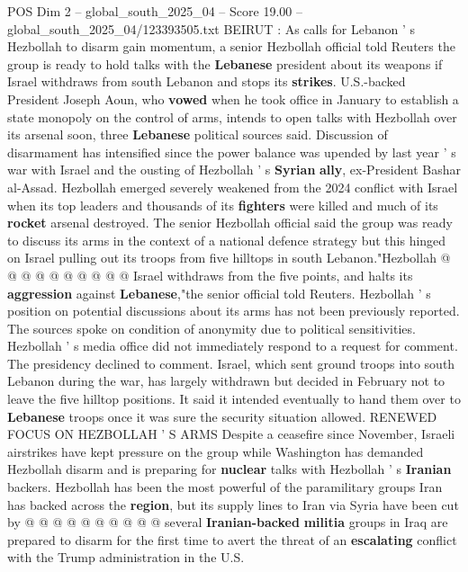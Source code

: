 \begin{textsample}{POS Dim 2 – global\_south\_2025\_04 – Score 19.00 – global\_south\_2025\_04/123393505.txt}  \label{ex:f2_pos_342}
BEIRUT : As calls for Lebanon ' s Hezbollah to disarm gain momentum, a senior Hezbollah official told Reuters the group is ready to hold talks with the \textbf{Lebanese} president about its weapons if Israel withdraws from south Lebanon and stops its \textbf{strikes}.
U.S.-backed President Joseph Aoun, who \textbf{vowed} when he took office in January to establish a state monopoly on the control of arms, intends to open talks with Hezbollah over its arsenal soon, three \textbf{Lebanese} political sources said.
Discussion of disarmament has intensified since the power balance was upended by last year ' s war with Israel and the ousting of Hezbollah ' s \textbf{Syrian} \textbf{ally}, ex-President Bashar al-Assad.
Hezbollah emerged severely weakened from the 2024 conflict with Israel when its top leaders and thousands of its \textbf{fighters} were killed and much of its \textbf{rocket} arsenal destroyed.
The senior Hezbollah official said the group was ready to discuss its arms in the context of a national defence strategy but this hinged on Israel pulling out its troops from five hilltops in south Lebanon."Hezbollah @ @ @ @ @ @ @ @ @ @ Israel withdraws from the five points, and halts its \textbf{aggression} against \textbf{Lebanese},"the senior official told Reuters.
Hezbollah ' s position on potential discussions about its arms has not been previously reported.
The sources spoke on condition of anonymity due to political sensitivities.
Hezbollah ' s media office did not immediately respond to a request for comment.
The presidency declined to comment.
Israel, which sent ground troops into south Lebanon during the war, has largely withdrawn but decided in February not to leave the five hilltop positions.
It said it intended eventually to hand them over to \textbf{Lebanese} troops once it was sure the security situation allowed.
RENEWED FOCUS ON HEZBOLLAH ' S ARMS Despite a ceasefire since November, Israeli airstrikes have kept pressure on the group while Washington has demanded Hezbollah disarm and is preparing for \textbf{nuclear} talks with Hezbollah ' s \textbf{Iranian} backers.
Hezbollah has been the most powerful of the paramilitary groups Iran has backed across the \textbf{region}, but its supply lines to Iran via Syria have been cut by @ @ @ @ @ @ @ @ @ @ several \textbf{Iranian-backed} \textbf{militia} groups in Iraq are prepared to disarm for the first time to avert the threat of an \textbf{escalating} conflict with the Trump administration in the U.S.

\end{textsample}
